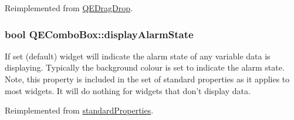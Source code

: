 Reimplemented from \hyperlink{classQEDragDrop}{QEDragDrop}.

\hypertarget{classQEComboBox_a72bca9ee7c0ea6272db17ae5a4268c53}{
\subsubsection[{displayAlarmState}]{\setlength{\rightskip}{0pt plus 5cm}bool QEComboBox::displayAlarmState}}
\label{classQEComboBox_a72bca9ee7c0ea6272db17ae5a4268c53}
If set (default) widget will indicate the alarm state of any variable data is displaying. Typically the background colour is set to indicate the alarm state. Note, this property is included in the set of standard properties as it applies to most widgets. It will do nothing for widgets that don't display data. 

Reimplemented from \hyperlink{classstandardProperties}{standardProperties}.

